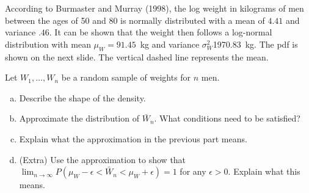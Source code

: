 \begin{frame}

  \begin{block}{\exercise}
  According to Burmaster and Murray (1998), the log weight in kilograms of men between the ages of 50 and 80 is normally distributed with a mean of $4.41$ and variance $.46$. It can be shown that the weight then follows a log-normal distribution with mean $\mu_W = 91.45$~kg and variance $\sigma^2_W$1970.83~kg. The pdf is shown on the next slide. The vertical dashed line represents the mean.
  
  Let $W_1,\ldots,W_n$ be a random sample of weights for $n$ men.
  
  \begin{enumerate}[a)]
  \item Describe the shape of the density.
  \item Approximate the distribution of $\bar W_n$. What conditions need to be satisfied?
  \item Explain what the approximation in the previous part means.
  \item (Extra) Use the approximation to show that $\lim_{n \to \infty} P(\mu_W-\epsilon < \bar W_n < \mu_W + \epsilon) = 1$ for any $\epsilon>0$. Explain what this means.  
  \end{enumerate}
  \end{block}
\end{frame}





